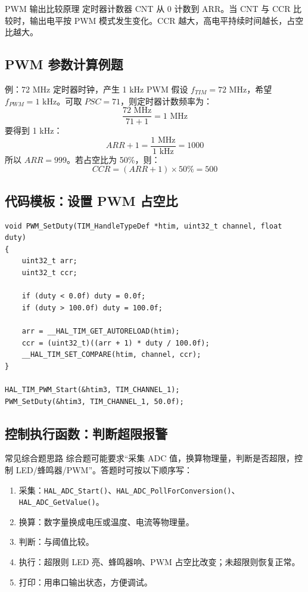 \documentclass[UTF8,fontset=none,12pt]{ctexart}
\newcommand{\api}[1]{{\footnotesize\nolinkurl{#1}}}
\begin{document}
\begin{pointbox}{PWM 输出比较原理}
定时器计数器 CNT 从 0 计数到 ARR。当 CNT 与 CCR 比较时，输出电平按 PWM 模式发生变化。CCR 越大，高电平持续时间越长，占空比越大。
\end{pointbox}

\subsection{PWM 参数计算例题}
\begin{pointbox}{例：72 MHz 定时器时钟，产生 1 kHz PWM}
假设 $f_{TIM}=72\text{ MHz}$，希望 $f_{PWM}=1\text{ kHz}$。可取 $PSC=71$，则定时器计数频率为：
\[
  \frac{72\text{ MHz}}{71+1}=1\text{ MHz}
\]
要得到 1 kHz：
\[
  ARR+1=\frac{1\text{ MHz}}{1\text{ kHz}}=1000
\]
所以 $ARR=999$。若占空比为 50\%，则：
\[
  CCR=(ARR+1)\times 50\%=500
\]
\end{pointbox}

\subsection{代码模板：设置 PWM 占空比}
\begin{lstlisting}[style=cstyle]
void PWM_SetDuty(TIM_HandleTypeDef *htim, uint32_t channel, float duty)
{
    uint32_t arr;
    uint32_t ccr;

    if (duty < 0.0f) duty = 0.0f;
    if (duty > 100.0f) duty = 100.0f;

    arr = __HAL_TIM_GET_AUTORELOAD(htim);
    ccr = (uint32_t)((arr + 1) * duty / 100.0f);
    __HAL_TIM_SET_COMPARE(htim, channel, ccr);
}

HAL_TIM_PWM_Start(&htim3, TIM_CHANNEL_1);
PWM_SetDuty(&htim3, TIM_CHANNEL_1, 50.0f);
\end{lstlisting}

\subsection{控制执行函数：判断超限报警}
\begin{pointbox}{常见综合题思路}
综合题可能要求“采集 ADC 值，换算物理量，判断是否超限，控制 LED/蜂鸣器/PWM”。答题时可按以下顺序写：
\begin{enumerate}
  \item 采集：\api{HAL_ADC_Start()}、\api{HAL_ADC_PollForConversion()}、\api{HAL_ADC_GetValue()}。
  \item 换算：数字量换成电压或温度、电流等物理量。
  \item 判断：与阈值比较。
  \item 执行：超限则 LED 亮、蜂鸣器响、PWM 占空比改变；未超限则恢复正常。
  \item 打印：用串口输出状态，方便调试。
\end{enumerate}
\end{pointbox}
\end{document}
